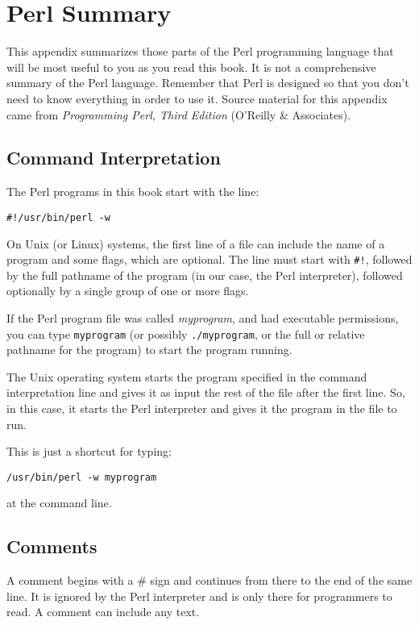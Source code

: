 \chapter{Perl Summary}
\label{chap:chapterab}
\minitoc

This appendix summarizes those parts of the Perl programming language that will be most useful to you as you read this book. It is not a comprehensive summary of the Perl language. Remember that Perl is designed so that you don't need to know everything in order to use it. Source material for this appendix came from \textit{Programming Perl, Third Edition} (O'Reilly \& Associates).

\section{Command Interpretation}
The Perl programs in this book start with the line:

\begin{lstlisting}
#!/usr/bin/perl -w
\end{lstlisting}

On Unix (or Linux) systems, the first line of a file can include the name of a program and some flags, which are optional. The line must start with \verb|#!|, followed by the full pathname of the program (in our case, the Perl interpreter), followed optionally by a single group of one or more flags.

If the Perl program file was called \textit{myprogram}, and had executable permissions, you can type \verb|myprogram| (or possibly \verb|./myprogram|, or the full or relative pathname for the program) to start the program running.

The Unix operating system starts the program specified in the command interpretation line and gives it as input the rest of the file after the first line. So, in this case, it starts the Perl interpreter and gives it the program in the file to run.

This is just a shortcut for typing:

\begin{lstlisting}
/usr/bin/perl -w myprogram 
\end{lstlisting}

at the command line.

\section{Comments}
A comment begins with a \# sign and continues from there to the end of the same line. It is ignored by the Perl interpreter and is only there for programmers to read. A comment can include any text.

